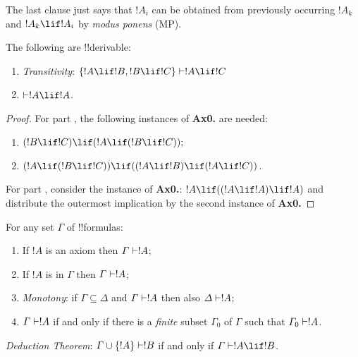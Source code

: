 \documentclass[../../include/open-logic-section]{subfiles}
\begin{document}
\begin{explain} The last clause just says that $!A_i$ can be obtained from
previously occurring $!A_k$ and $!A_k \lif !A_i$ by \emph{modus ponens}
(MP). 
\end{explain}

\begin{prop} The following are !!{derivable}:
\begin{enumerate} 
\item \emph{Transitivity}: $\{!A\lif !B, !B\lif !C\}
\Proves !A\lif!C$ 
\item $\Proves !A \lif !A$.  
\end{enumerate} 
\end{prop}

\begin{proof} For part , the
following instances of \textbf{Ax0.} are needed: 
\begin{enumerate} 
\item $(!B \lif !C) \lif (!A \lif (!B \lif !C));$ 
\item $(!A \lif (!B \lif !C))\lif ((!A \lif !B) \lif (!A \lif !C))$. 
\end{enumerate} 
For part , consider the instance of
\textbf{Ax0.}: $!A \lif ((!A \lif !A) \lif !A)$ and distribute the
outermost implication by the second instance of \textbf{Ax0.} 
\end{proof}

\begin{prop} For any set $\Gamma$ of !!{formula}s:
\begin{enumerate} 
\item If $!A$ is an axiom then $\Gamma \Proves !A$; 
\item If $!A$ is in $\Gamma$ then $\Gamma \Proves
!A$;
\item \emph{Monotony}: if $\Gamma
\subseteq \Delta$ and $\Gamma \Proves !A$ then also $\Delta \Proves
!A$; 
\item $\Gamma \Proves !A$ if and only
if there is a \emph{finite} subset $\Gamma_0$ of $\Gamma$ such that
$\Gamma_0 \Proves !A$. 
\end{enumerate} 
\end{prop}

\begin{thm} \emph{Deduction Theorem}: $\Gamma
\cup \{!A\} \Proves !B$ if and only if $\Gamma \Proves !A \lif !B$.
\end{thm} 
\end{document}
